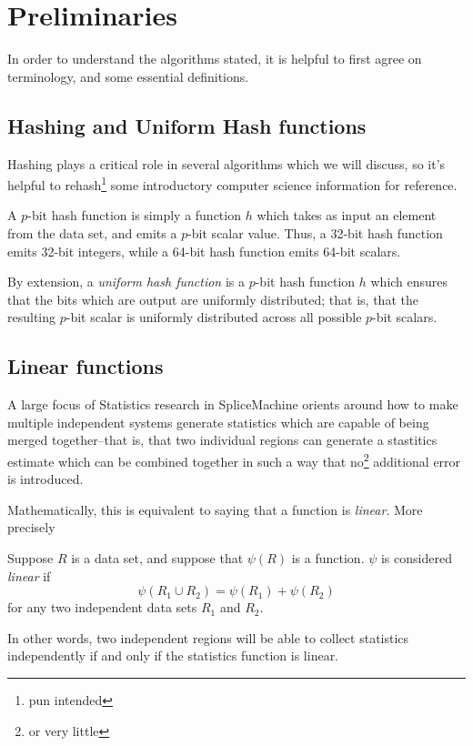 \section{Preliminaries}
In order to understand the algorithms stated, it is helpful to first agree on terminology, and some essential definitions.

\subsection{Hashing and Uniform Hash functions}
Hashing plays a critical role in several algorithms which we will discuss, so it's helpful to rehash\footnote{pun intended} some introductory computer science information for reference.

A $p$-bit hash function is simply a function $h$ which takes as input an element from the data set, and emits a $p$-bit scalar value. Thus, a 32-bit hash function emits 32-bit integers, while a 64-bit hash function emits 64-bit scalars.

By extension, a \emph{uniform hash function} is a $p$-bit hash function $h$ which ensures that the bits which are output are uniformly distributed; that is, that the resulting $p$-bit scalar is uniformly distributed across all possible $p$-bit scalars.

\subsection{Linear functions}
A large focus of Statistics research in SpliceMachine orients around how to make multiple independent systems generate statistics which are capable of being merged together--that is, that two individual regions can generate a stastitics estimate which can be combined together in such a way that no\footnote{or very little} additional error is introduced.

Mathematically, this is equivalent to saying that a function is \emph{linear}. More precisely

\begin{defn}
				Suppose $R$ is a data set, and suppose that $\psi(R)$ is a function. $\psi$ is considered \emph{linear} if 
				\begin{displaymath}
								\psi(R_1 \cup R_2) = \psi(R_1) + \psi(R_2)
				\end{displaymath}
				for any two independent data sets $R_1$ and $R_2$.
\end{defn}

In other words, two independent regions will be able to collect statistics independently if and only if the statistics function is linear. 

